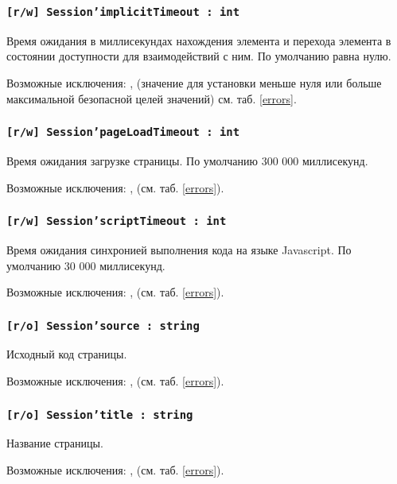 \subsubsection{\texttt{[r/w] Session'implicitTimeout : int}}

Время ожидания в миллисекундах нахождения элемента и перехода элемента в состоянии доступности для взаимодействий с ним. По умолчанию равна нулю.

Возможные исключения: ,  (значение для установки меньше нуля или больше максимальной безопасной целей значений) см. таб. \ref{errors}.

\subsubsection{\texttt{[r/w] Session'pageLoadTimeout : int}}

Время ожидания загрузке страницы. По умолчанию 300 000 миллисекунд.

Возможные исключения: ,  (см. таб. \ref{errors}).

\subsubsection{\texttt{[r/w] Session'scriptTimeout : int}}

Время ожидания синхронией выполнения кода на языке Javascript. По умолчанию 30 000 миллисекунд.

Возможные исключения: ,  (см. таб. \ref{errors}).

\subsubsection{\texttt{[r/o] Session'source : string}}

Исходный код страницы.

Возможные исключения: ,  (см. таб. \ref{errors}).

\subsubsection{\texttt{[r/o] Session'title : string}}

Название страницы.

Возможные исключения: ,  (см. таб. \ref{errors}).

